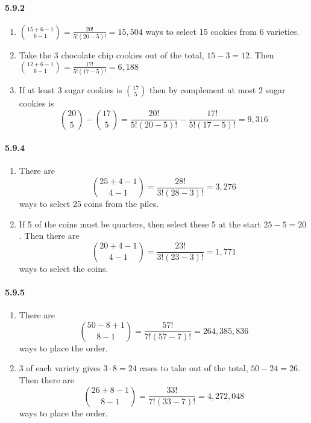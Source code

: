 \documentclass[11pt, letterpaper, twocolumn, fleqn]{article}
\begin{document}
\paragraph{5.9.2}
\begin{enumerate}
  \item $\binom{15+6-1}{6-1} = \frac{20!}{5!(20-5)!} = 15,504$ ways to select 15 cookies from 6 varieties.
  \item Take the 3 chocolate chip cookies out of the total, $15-3=12$. Then $\binom{12+6-1}{6-1} = \frac{17!}{5!(17-5)!} = 6,188$
  \item If at least 3 sugar cookies is $\binom{17}{5}$ then by complement at most 2 sugar cookies is 
    $$\binom{20}{5} - \binom{17}{5} = \frac{20!}{5!(20-5)!} - \frac{17!}{5!(17-5)!} = 9,316$$
\end{enumerate}

\paragraph{5.9.4}
\begin{enumerate}
  \item There are 
    $$\binom{25+4-1}{4-1} = \frac{28!}{3!(28-3)!} = 3,276$$
  ways to select 25 coins from the piles.
  \item If 5 of the coins must be quarters, then select these 5 at the start $25-5 = 20$. Then there are 
    $$\binom{20+4-1}{4-1} = \frac{23!}{3!(23-3)!} = 1,771$$
  ways to select the coins.
\end{enumerate}

\paragraph{5.9.5}
\begin{enumerate}
  \item There are 
    $$\binom{50-8+1}{8-1} = \frac{57!}{7!(57-7)!} = 264,385,836$$
  ways to place the order.
  \item 3 of each variety gives $3 \cdot 8 = 24$ cases to take out of the total, $50-24 = 26$. Then there are 
    $$\binom{26+8-1}{8-1} = \frac{33!}{7!(33-7)!} = 4,272,048$$
  ways to place the order.
\end{enumerate}
\end{document}
